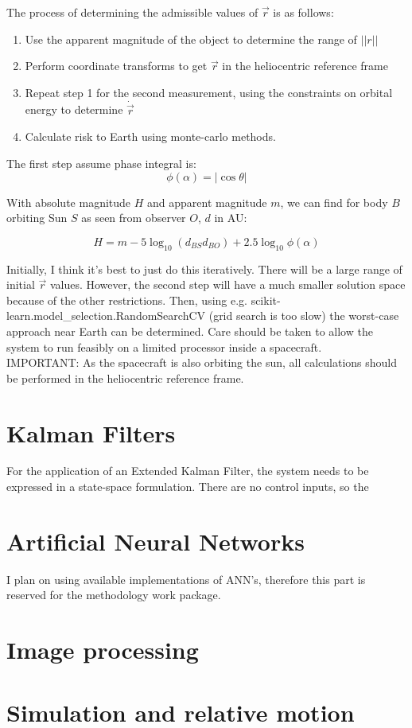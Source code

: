 \documentclass[a4paper,10pt]{article}
\begin{document}
The process of determining the admissible values of $\vec{r}$ is as follows:
\begin{enumerate}
 \item Use the apparent magnitude of the object to determine the range of $||r||$
 \item Perform coordinate transforms to get $\vec{r}$ in the heliocentric reference frame
 \item Repeat step 1 for the second measurement, using the constraints on orbital energy to determine $\dot{\vec{r}}$
 \item Calculate risk to Earth using monte-carlo methods.
\end{enumerate}

The first step assume phase integral is:
\begin{equation}
 \phi(\alpha) = |\cos{\theta}|
\end{equation}


With absolute magnitude $H$ and apparent magnitude $m$, we can find for body $B$ orbiting Sun $S$ as seen from observer $O$, $d$ in AU:

\begin{equation}
 H = m - 5 \log _{10} \left(d_{BS}d_{BO}\right) + 2.5\log _{10} \phi(\alpha)
\end{equation}

Initially, I think it's best to just do this iteratively. There will be a large range of initial $\vec{r}$ values. However, the second step will have a much smaller solution space because of the other restrictions. Then, using e.g. scikit-learn.model\_selection.RandomSearchCV (grid search is too slow) the worst-case approach near Earth can be determined. Care should be taken to allow the system to run feasibly on a limited processor inside a spacecraft.\\

IMPORTANT: As the spacecraft is also orbiting the sun, all calculations should be performed in the heliocentric reference frame.

\section{Kalman Filters}

For the application of an Extended Kalman Filter, the system needs to be expressed in a state-space formulation. There are no control inputs, so the

\section{Artificial Neural Networks}

I plan on using available implementations of ANN's, therefore this part is reserved for the methodology work package.

\section{Image processing}



\section{Simulation and relative motion}
\end{document}
